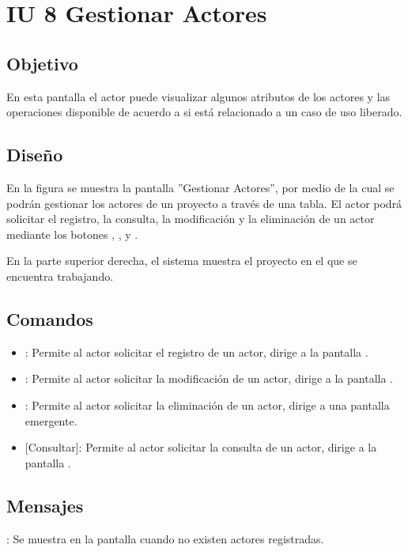 \section{IU 8 Gestionar Actores}

\subsection{Objetivo}
	En esta pantalla el actor puede visualizar algunos atributos de los actores y las operaciones disponible de acuerdo a si está relacionado a un caso de uso liberado.
\subsection{Diseño}
	En la figura  se muestra la pantalla ''Gestionar Actores'', por medio de la cual se podrán gestionar los actores de un proyecto a través de una tabla. El actor podrá solicitar el registro, la consulta, la modificación y la eliminación de un actor mediante los botones , , \editar y \eliminar.
	
	En la parte superior derecha, el sistema muestra el proyecto en el que se encuentra trabajando.

\subsection{Comandos}
\begin{itemize}
	\item {}: Permite al actor solicitar el registro de un actor, dirige a la pantalla .
	\item \editar [Modificar]: Permite al actor solicitar la modificación de un actor, dirige a la pantalla .
	\item \eliminar [Eliminar]: Permite al actor solicitar la eliminación de un actor, dirige a una pantalla emergente.
	\item {} [Consultar]: Permite al actor solicitar la consulta de un actor, dirige a la pantalla  .
\end{itemize}
\subsection{Mensajes}

\begin{Citemize}
	\item {}: Se muestra en la pantalla  cuando no existen actores registradas.
\end{Citemize}
